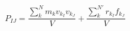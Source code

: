 \documentclass[12pt]{article}
\begin{document}
$$
   P_{IJ} = \frac{\sum_{k}^{N} m_k v_{k_I} v_{k_J}}{V} + 
   \frac{\sum_{k}^{N'} r_{k_I} f_{k_J}}{V}
$$
\end{document}

